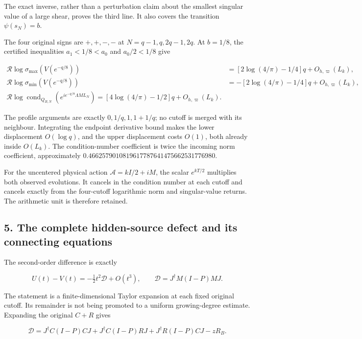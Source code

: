 \documentclass[10pt]{article}
\begin{document}
The exact inverse, rather than a perturbation claim about the smallest singular value of a large shear, proves the third line. It also covers the transition \(\psi(s_N)=b\).

The four original signs are \(+,+,-,-\) at \(N=q-1,q,2q-1,2q\). At \(b=1/8\), the certified inequalities \(a_1<1/8<a_0\) and \(a_0/2<1/8\) give

\[
\begin{aligned}
\mathcal R\log\sigma_{\max}(V(e^{-q/8}))
&=[2\log(4/\pi)-1/4]q+O_{h,\varpi}(L_k),\\
\mathcal R\log\sigma_{\min}(V(e^{-q/8}))
&=-[2\log(4/\pi)-1/4]q+O_{h,\varpi}(L_k),\\
\boxed{\mathcal R\log\operatorname{cond}_{Q_{B,N}}(e^{ie^{-q/8}\Lambda ML_N})
=[4\log(4/\pi)-1/2]q+O_{h,\varpi}(L_k).}
\end{aligned} \tag{CE23}
\]

The profile arguments are exactly \(0,1/q,1,1+1/q\); no cutoff is merged with its neighbour. Integrating the endpoint derivative bound makes the lower displacement \(O(\log q)\), and the upper displacement costs \(O(1)\), both already inside \(O(L_k)\). The condition-number coefficient is twice the incoming norm coefficient, approximately \(0.4662579010819617787641475662531776980\).

For the uncentered physical action \(\mathscr A=kI/2+iM\), the scalar \(e^{kT/2}\) multiplies both observed evolutions. It cancels in the condition number at each cutoff and cancels exactly from the four-cutoff logarithmic norm and singular-value returns. The arithmetic unit is therefore retained.

\subsection{5. The complete hidden-source defect and its connecting equations}\label{the-complete-hidden-source-defect-and-its-connecting-equations}

The second-order difference is exactly

\[
U(t)-V(t)=-\tfrac12t^2\mathcal D+O(t^3),\qquad
\mathcal D=J^\dagger M(I-P)MJ. \tag{CE24}
\]

The statement is a finite-dimensional Taylor expansion at each fixed original cutoff. Its remainder is not being promoted to a uniform growing-degree estimate. Expanding the original \(C+R\) gives

\[
\boxed{\mathcal D=J^\dagger C(I-P)CJ
+J^\dagger C(I-P)RJ+J^\dagger R(I-P)CJ-zR_B.} \tag{CE25}
\]
\end{document}
